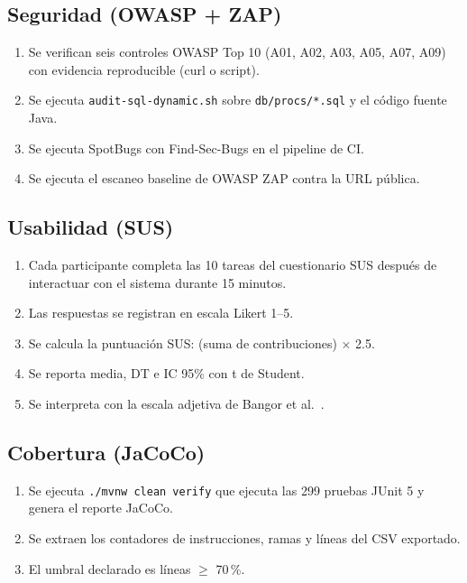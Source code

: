 \subsection{Seguridad (OWASP + ZAP)}

\begin{enumerate}
  \item Se verifican seis controles OWASP Top 10 (A01, A02, A03, A05, A07, A09) con evidencia reproducible (curl o script).
  \item Se ejecuta \texttt{audit-sql-dynamic.sh} sobre \texttt{db/procs/*.sql} y el código fuente Java.
  \item Se ejecuta SpotBugs con Find-Sec-Bugs en el pipeline de CI.
  \item Se ejecuta el escaneo baseline de OWASP ZAP contra la URL pública.
\end{enumerate}

\subsection{Usabilidad (SUS)}

\begin{enumerate}
  \item Cada participante completa las 10 tareas del cuestionario SUS \cite{brooke1996} después de interactuar con el sistema durante 15 minutos.
  \item Las respuestas se registran en escala Likert 1--5.
  \item Se calcula la puntuación SUS: (suma de contribuciones) $\times$ 2.5.
  \item Se reporta media, DT e IC 95\% con t de Student.
  \item Se interpreta con la escala adjetiva de Bangor et al.~\cite{bangor2009,bangor2008}.
\end{enumerate}

\subsection{Cobertura (JaCoCo)}

\begin{enumerate}
  \item Se ejecuta \texttt{./mvnw clean verify} que ejecuta las 299 pruebas JUnit 5 y genera el reporte JaCoCo.
  \item Se extraen los contadores de instrucciones, ramas y líneas del CSV exportado.
  \item El umbral declarado es líneas $\geq$ 70\,\%.
\end{enumerate}

